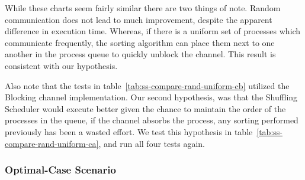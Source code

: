 While these charts seem fairly similar there are two things of note. Random
communication does not lead to much improvement, despite the apparent
difference in execution time. 
Whereas, if there is a uniform set of processes which communicate 
frequently, the sorting algorithm can place them next to one another in the
process queue to quickly unblock the channel. This result is consistent 
with our hypothesis.

Also note that the tests in table~\ref{tab:ss-compare-rand-uniform-cb} utilized
the Blocking channel implementation. Our second hypothesis, was that the 
Shuffling Scheduler would execute better given the chance to maintain the
order of the processes in the queue, if the channel absorbs the process, 
any sorting performed previously has been a wasted effort. We test this
hypothesis in table~\ref{tab:ss-compare-rand-uniform-ca}, and run all four tests
again.

%
%
%

\subsubsection{Optimal-Case Scenario}\label{sec:results-smartsort-optimal}

